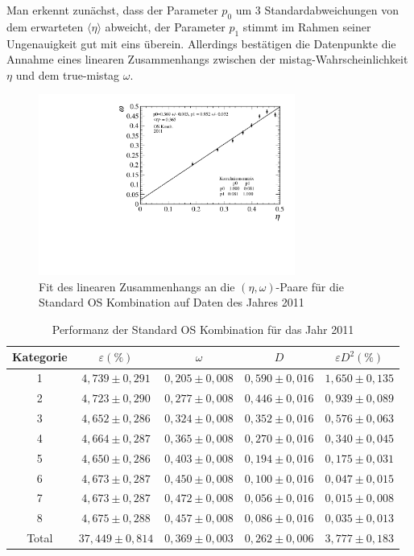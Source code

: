 Man erkennt zunächst, dass der Parameter $p_0$ um \num{3} Standardabweichungen von dem erwarteten $\langle\eta\rangle$ abweicht, der Parameter $p_1$ stimmt im Rahmen seiner Ungenauigkeit gut mit eins überein. Allerdings bestätigen die Datenpunkte die Annahme eines linearen Zusammenhangs zwischen der mistag-Wahrscheinlichkeit $\eta$ und dem true-mistag $\omega$. 
\begin{figure}[htbp]
	\centering
		\includegraphics[width=0.75\textwidth]{fig/2011_OScomb.pdf}
	\caption{Fit des linearen Zusammenhangs an die $(\eta,\omega)$-Paare für die Standard OS Kombination auf Daten des Jahres \num{2011}}
	\label{fig:2011_OScomb} 
\end{figure} 
\begin{table}[htbp]
	\centering
	\caption{Performanz der Standard OS Kombination für das Jahr \num{2011}}
	\label{tab:2011_OScomb}
	\begin{tabular}{ccccc}
	\toprule
       Kategorie & $\varepsilon(\%)$ & $\omega$ & $D$ & $\varepsilon D^2(\%)$ \\ 
       \midrule 
       1 & $4{,}739\pm0{,}291$ & $0{,}205\pm0{,}008$ & $0{,}590\pm0{,}016$ & $1{,}650\pm0{,}135$\\
       2 & $4{,}723\pm0{,}290$ & $0{,}277\pm0{,}008$ & $0{,}446\pm0{,}016$ & $0{,}939\pm0{,}089$\\ 
       3 & $4{,}652\pm0{,}286$ & $0{,}324\pm0{,}008$ & $0{,}352\pm0{,}016$ & $0{,}576\pm0{,}063$\\ 
       4 & $4{,}664\pm0{,}287$ & $0{,}365\pm0{,}008$ & $0{,}270\pm0{,}016$ & $0{,}340\pm0{,}045$\\ 
       5 & $4{,}650\pm0{,}286$ & $0{,}403\pm0{,}008$ & $0{,}194\pm0{,}016$ & $0{,}175\pm0{,}031$\\ 
       6 & $4{,}673\pm0{,}287$ & $0{,}450\pm0{,}008$ & $0{,}100\pm0{,}016$ & $0{,}047\pm0{,}015$\\ 
       7 & $4{,}673\pm0{,}287$ & $0{,}472\pm0{,}008$ & $0{,}056\pm0{,}016$ & $0{,}015\pm0{,}008$\\ 
       8 & $4{,}675\pm0{,}288$ & $0{,}457\pm0{,}008$ & $0{,}086\pm0{,}016$ & $0{,}035\pm0{,}013$\\ 
       \midrule
   Total & $37{,}449\pm0{,}814$& $0{,}369\pm0{,}003$ & $0{,}262\pm0{,}006$ & $3{,}777\pm0{,}183$\\ 
   \bottomrule
	\end{tabular}
\end{table}
